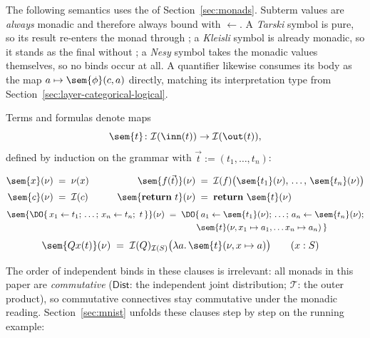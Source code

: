 \documentclass[anon]{../../journal-templates/NeSy26/nesy2026} %
\begin{document}
The following semantics uses the \doNotation of Section~\ref{sec:monads}.
Subterm values are \emph{always} monadic and therefore always bound with
$\leftarrow$. A \emph{Tarski} symbol is pure, so its result re-enters the monad through
; a \emph{Kleisli} symbol is already monadic, so it stands as the final
\doExpression without ; a \emph{Nesy} symbol takes the monadic values
themselves, so no binds occur at all. A quantifier likewise consumes its body as the map $a \mapsto \sem{\phi}(c,a)$ directly, matching its interpretation type from
Section~\ref{sec:layer-categorical-logical}.

\begin{definition}
\label{def:Semantics}
Terms and formulas denote maps
\[
  \sem{t} \colon \mathcal I(\inn(t)) \to \mathcal I(\out(t)),
\]
defined by induction on the grammar with $\vec t:=(t_1, \ldots, t_n)$: 

{\setlength{\abovedisplayskip}{4pt}\setlength{\belowdisplayskip}{4pt}%
 \setlength{\abovedisplayshortskip}{4pt}\setlength{\belowdisplayshortskip}{4pt}
\begin{align*}
  \sem{x}(\nu) \;&=\; \nu(x)
    &\qquad
  \sem{f(\vec t)}(\nu) \;&=\;
    \mathcal I(f)\bigl(\sem{t_1}(\nu),\, \ldots,\, \sem{t_n}(\nu)\bigr)
    \\[2pt]
  \sem{c}(\nu) \;&=\; \mathcal I(c)
    &\qquad
  \sem{\mathbf{return}\ t}(\nu) \;&=\;
    \mathbf{return}\ \sem{t}(\nu)
\end{align*}
\begin{align*}
  \sem{\DO\{\, x_1 \leftarrow t_1;\, \ldots;\, x_n \leftarrow t_n;\ t \,\}}(\nu) \;&=\;
    \DO\{\, a_1 \leftarrow \sem{t_1}(\nu);\,\ldots;\, a_n \leftarrow \sem{t_n}(\nu);\\
  &\hphantom{{}=\;}\qquad \sem{t}(\nu, x_1\mapsto a_1,\ldots x_n\mapsto a_n)
     \,\}
\end{align*}
\begin{align*}
  \sem{Qx(t)}(\nu) \;&=\;
    \mathcal I(Q)_{\mathcal I(S)}\bigl(\lambda a.\,\sem{t}(\nu, x\mapsto a)\bigr) \qquad (x : S)
\end{align*}}
\end{definition} 

\noindent
The order of independent binds in these clauses is irrelevant: all monads in this paper are
\emph{commutative} \citep{kockMonadsSymmetric1970} ($\mathsf{Dist}$: the independent joint
distribution; $\mathcal{T}$: the outer product), so commutative
connectives stay commutative under the monadic reading.
Section~\ref{sec:mnist} unfolds these clauses step by step on the running example:
\end{document}
